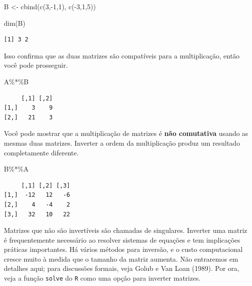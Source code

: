 \documentclass[
  letterpaper,
  DIV=11,
  numbers=noendperiod]{scrreprt}
\newenvironment{Shaded}{\begin{snugshade}}{\end{snugshade}}
\newcommand{\DecValTok}[1]{\textcolor[rgb]{0.68,0.00,0.00}{#1}}
\newcommand{\FunctionTok}[1]{\textcolor[rgb]{0.28,0.35,0.67}{#1}}
\newcommand{\NormalTok}[1]{\textcolor[rgb]{0.00,0.23,0.31}{#1}}
\newcommand{\OtherTok}[1]{\textcolor[rgb]{0.00,0.23,0.31}{#1}}
\newcommand{\SpecialCharTok}[1]{\textcolor[rgb]{0.37,0.37,0.37}{#1}}
\begin{document}
\begin{Shaded}
\begin{Highlighting}[]
\NormalTok{B }\OtherTok{\textless{}{-}}  \FunctionTok{cbind}\NormalTok{(}\FunctionTok{c}\NormalTok{(}\DecValTok{3}\NormalTok{,}\SpecialCharTok{{-}}\DecValTok{1}\NormalTok{,}\DecValTok{1}\NormalTok{), }\FunctionTok{c}\NormalTok{(}\SpecialCharTok{{-}}\DecValTok{3}\NormalTok{,}\DecValTok{1}\NormalTok{,}\DecValTok{5}\NormalTok{))}

\FunctionTok{dim}\NormalTok{(B)}
\end{Highlighting}
\end{Shaded}

\begin{verbatim}
[1] 3 2
\end{verbatim}

Isso confirma que as duas matrizes são compatíveis para a multiplicação,
então você pode prosseguir.

\begin{Shaded}
\begin{Highlighting}[]
\NormalTok{A}\SpecialCharTok{\%*\%}\NormalTok{B}
\end{Highlighting}
\end{Shaded}

\begin{verbatim}
     [,1] [,2]
[1,]    3    9
[2,]   21    3
\end{verbatim}

Você pode mostrar que a multiplicação de matrizes é \textbf{não
comutativa} usando as mesmas duas matrizes. Inverter a ordem da
multiplicação produz um resultado completamente diferente.

\begin{Shaded}
\begin{Highlighting}[]
\NormalTok{B}\SpecialCharTok{\%*\%}\NormalTok{A}
\end{Highlighting}
\end{Shaded}

\begin{verbatim}
     [,1] [,2] [,3]
[1,]  -12   12   -6
[2,]    4   -4    2
[3,]   32   10   22
\end{verbatim}

Matrizes que não são invertíveis são chamadas de singulares. Inverter
uma matriz é frequentemente necessário ao resolver sistemas de equações
e tem implicações práticas importantes. Há vários métodos para inversão,
e o custo computacional cresce muito à medida que o tamanho da matriz
aumenta. Não entraremos em detalhes aqui; para discussões formais, veja
Golub e Van Loan (1989). Por ora, veja a função \texttt{solve} do
\texttt{R} como uma opção para inverter matrizes.
\end{document}
